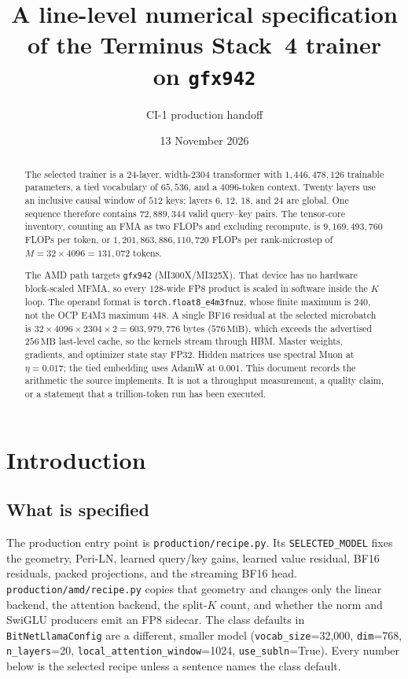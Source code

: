 \documentclass[11pt]{article}
\title{A line-level numerical specification of the Terminus Stack~4 trainer\\
on \texttt{gfx942}}
\author{CI-1 production handoff}
\date{13 November 2026}
\DeclareRobustCommand{\code}[1]{\texttt{#1}}
\newcommand{\MiB}{\,\mathrm{MiB}}
\begin{document}
\maketitle

\begin{abstract}
The selected trainer is a 24-layer, width-\(2304\) transformer with
\(1{,}446{,}478{,}126\) trainable parameters, a tied vocabulary of
\(65{,}536\), and a \(4096\)-token context. Twenty layers use an inclusive
causal window of \(512\) keys; layers \(6\), \(12\), \(18\), and \(24\) are
global. One sequence therefore contains \(72{,}889{,}344\) valid query--key
pairs. The tensor-core inventory, counting an FMA as two FLOPs and excluding
recompute, is \(9{,}169{,}493{,}760\) FLOPs per token, or
\(1{,}201{,}863{,}886{,}110{,}720\) FLOPs per rank-microstep of
\(M=32\times 4096=131{,}072\) tokens.

The AMD path targets \code{gfx942} (MI300X/MI325X). That device has no
hardware block-scaled MFMA, so every \(128\)-wide FP8 product is scaled in
software inside the \(K\) loop. The operand format is
\code{torch.float8\_e4m3fnuz}, whose finite maximum is \(240\), not the OCP
E4M3 maximum \(448\). A single BF16 residual at the selected microbatch is
\(32\times 4096\times 2304\times 2=603{,}979{,}776\) bytes
(\(576\MiB\)), which exceeds the advertised \(256\,\mathrm{MB}\) last-level
cache, so the kernels stream through HBM. Master weights, gradients, and
optimizer state stay FP32. Hidden matrices use spectral Muon at
\(\eta=0.017\); the tied embedding uses AdamW at \(0.001\). This document
records the arithmetic the source implements. It is not a throughput
measurement, a quality claim, or a statement that a trillion-token run has
been executed.
\end{abstract}

\section{Introduction}

\subsection{What is specified}

The production entry point is \code{production/recipe.py}. Its
\code{SELECTED\_MODEL} fixes the geometry, Peri-LN, learned query/key gains,
learned value residual, BF16 residuals, packed projections, and the streaming
BF16 head. \code{production/amd/recipe.py} copies that geometry and changes
only the linear backend, the attention backend, the split-\(K\) count, and
whether the norm and SwiGLU producers emit an FP8 sidecar. The class defaults
in \code{BitNetLlamaConfig} are a different, smaller model
(\code{vocab\_size}=32{,}000, \code{dim}=768, \code{n\_layers}=20,
\code{local\_attention\_window}=1024, \code{use\_subln}=True). Every number
below is the selected recipe unless a sentence names the class default.
\end{document}
